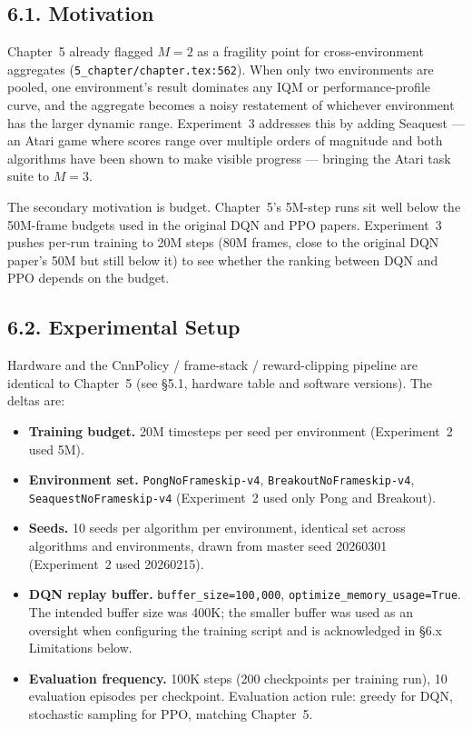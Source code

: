 \documentclass[11pt,a4paper]{article}
\newcommand{\fileline}[1]{\texttt{\small #1}}
\begin{document}
\subsection*{6.1. Motivation}

Chapter~5 already flagged $M=2$ as a fragility point for cross-environment
aggregates (\fileline{5\_chapter/chapter.tex:562}). When only two
environments are pooled, one environment's result dominates any IQM or
performance-profile curve, and the aggregate becomes a noisy restatement
of whichever environment has the larger dynamic range. Experiment~3
addresses this by adding Seaquest --- an Atari game where scores range
over multiple orders of magnitude and both algorithms have been shown
to make visible progress --- bringing the Atari task suite to $M=3$.

The secondary motivation is budget. Chapter~5's 5M-step runs sit well
below the 50M-frame budgets used in the original DQN and PPO papers.
Experiment~3 pushes per-run training to 20M steps (80M frames, close to
the original DQN paper's 50M but still below it) to see whether the
ranking between DQN and PPO depends on the budget.

\subsection*{6.2. Experimental Setup}

Hardware and the CnnPolicy / frame-stack / reward-clipping pipeline are
identical to Chapter~5 (see \S5.1, hardware table and software versions).
The deltas are:

\begin{itemize}[leftmargin=*]
  \item \textbf{Training budget.} 20M timesteps per seed per environment
  (Experiment~2 used 5M).
  \item \textbf{Environment set.} \texttt{PongNoFrameskip-v4},
  \texttt{BreakoutNoFrameskip-v4}, \texttt{SeaquestNoFrameskip-v4}
  (Experiment~2 used only Pong and Breakout).
  \item \textbf{Seeds.} 10 seeds per algorithm per environment,
  identical set across algorithms and environments, drawn from master
  seed 20260301 (Experiment~2 used 20260215).
  \item \textbf{DQN replay buffer.}
  \texttt{buffer\_size=100{,}000}, \texttt{optimize\_memory\_usage=True}.
  The intended buffer size was 400K; the smaller buffer was used as an
  oversight when configuring the training script and is acknowledged
  in \S6.x Limitations below.
  \item \textbf{Evaluation frequency.} 100K steps (200 checkpoints per
  training run), 10 evaluation episodes per checkpoint. Evaluation
  action rule: greedy for DQN, stochastic sampling for PPO, matching
  Chapter~5.
\end{itemize}
\end{document}
